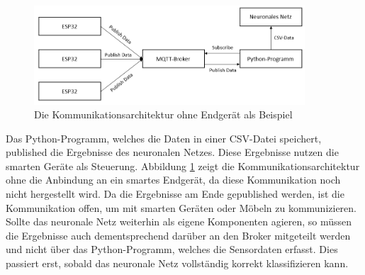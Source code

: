 \begin{figure}[H]
	\centering
		\includegraphics[width=0.9\textwidth]{images/com_arch.png}
	\caption{Die Kommunikationsarchitektur ohne Endgerät als Beispiel}
	\label{fig:com_arch}
\end{figure}
\newline
Das Python-Programm, welches die Daten in einer CSV-Datei speichert, published die Ergebnisse des neuronalen Netzes. Diese Ergebnisse nutzen die smarten Geräte als Steuerung. Abbildung \ref{fig:com_arch} zeigt die Kommunikationsarchitektur ohne die Anbindung an ein smartes Endgerät, da diese Kommunikation noch nicht hergestellt wird. Da die Ergebnisse am Ende gepublished werden, ist die Kommunikation offen, um mit smarten Geräten oder Möbeln zu kommunizieren. Sollte das neuronale Netz weiterhin als eigene Komponenten agieren, so müssen die Ergebnisse auch dementsprechend darüber an den Broker mitgeteilt werden und nicht über das Python-Programm, welches die Sensordaten erfasst. Dies passiert erst, sobald das neuronale Netz vollständig korrekt klassifizieren kann.

